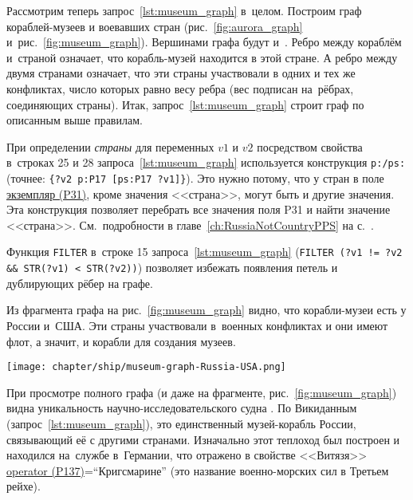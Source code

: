 Рассмотрим теперь запрос~\ref{lst:museum_graph} в~целом. 
Построим граф кораблей-музеев и воевавших стран 
(рис.~\ref{fig:aurora_graph} и~рис.~\ref{fig:museum_graph}). 
Вершинами графа будут  
                    и~. 
Ребро между кораблём и~страной означает, что корабль-музей находится в этой стране. 
А ребро между двумя странами означает, 
что эти страны участвовали в одних и тех же конфликтах, число которых равно весу ребра 
(вес подписан на~рёбрах, соединяющих страны). 
Итак, запрос~\ref{lst:museum_graph} строит граф по описанным выше правилам. 

    При определении \emph{страны} для переменных $v1$ и $v2$ 
    посредством свойства  
    в~строках 25 и 28 запроса~\ref{lst:museum_graph} 
    используется конструкция \texttt{p:/ps:} (точнее: \texttt{\{?v2 p:P17 [ps:P17 ?v1]\}}). 
    Это нужно потому, что у стран в поле 
    \href{https://www.wikidata.org/wiki/Property:P31}{экземпляр (P31)}, 
    кроме значения <<страна>>, могут быть и другие значения. 
    Эта конструкция позволяет перебрать все значения поля P31 и найти значение <<страна>>.
    См.~подробности в главе~\ref{ch:RussiaNotCountryPPS} на с.~\pageref{ch:RussiaNotCountryPPS}.

    Функция \lstinline|FILTER|
    в~строке 15 запроса~\ref{lst:museum_graph} 
    \mbox{(\lstinline|FILTER (?v1 != ?v2 && STR(?v1) < STR(?v2))|)} 
    позволяет избежать появления петель и дублирующих рёбер на графе.

Из фрагмента графа на рис.~\ref{fig:museum_graph} видно, 
что корабли-музеи есть у России и~США. 
Эти страны участвовали в~военных конфликтах и они имеют флот, 
а значит, и корабли для создания музеев.


\begin{figure*}[h!]
  \texttt{[image: chapter/ship/museum-graph-Russia-USA.png]}
  \caption[Граф стран и кораблей-музеев, 2021 год.]
          {Фрагмент графа стран, участвовавших в войнах, и~кораблей-музеев России и США, 2021 год}%
  \label{fig:museum_graph}%
\end{figure*}

При просмотре полного графа (и даже на фрагменте, рис.~\ref{fig:museum_graph}) 
видна уникальность научно-иссле\-до\-ва\-тель\-ского судна . 
По Викиданным (запрос~\ref{lst:museum_graph}), 
это единственный музей-корабль России, связывающий её с другими странами. 
Изначально этот теплоход был построен и находился на~службе в~Германии, 
что отражено в свойстве <<Витязя>> 
\href{https://www.wikidata.org/wiki/Property:P137}{operator (P137)}=``Кригсма\-рине'' 
(это название военно-морских сил в Третьем рейхе).


